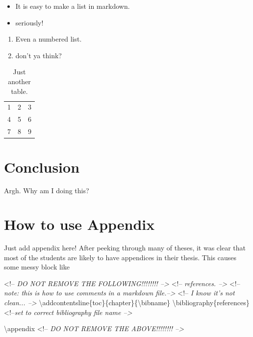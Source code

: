 \documentclass[oneside,phd,]{snuthesis}
\newenvironment{Shaded}{\begin{snugshade}}{\end{snugshade}}
\newcommand{\CommentTok}[1]{\textcolor[rgb]{0.56,0.35,0.01}{\textit{{#1}}}}
\newcommand{\NormalTok}[1]{{#1}}
\providecommand{\tightlist}{%
  \setlength{\itemsep}{0pt}\setlength{\parskip}{0pt}}
\begin{document}
\begin{itemize}
\tightlist
\item
  It is easy to make a list in markdown.
\item
  seriously!
\end{itemize}

\begin{enumerate}
\def\labelenumi{\arabic{enumi}.}
\tightlist
\item
  Even a numbered list.
\item
  don't ya think?
\end{enumerate}

\begin{table}
\caption{Just another table.}
\begin{center}
\begin{tabular}{ l | c | r }
  1 & 2 & 3 \\
  4 & 5 & 6 \\
  7 & 8 & 9 \\
\end{tabular}
\end{center}
\end{table}

\chapter{Conclusion}\label{conclusion}

Argh. Why am I doing this? \citet{Nesterov:DoklAkadNaukSssr:1983}
\citep{Boyd:ConvexOptimization:2004}
\citet{Bertsekas:ConvexOptimizationTheory:2009}




\appendix

\chapter{How to use Appendix}\label{how-to-use-appendix}

Just add appendix here! After peeking through many of theses, it was
clear that most of the students are likely to have appendices in their
thesis. This causes some messy block like

\begin{Shaded}
\begin{Highlighting}[]
\NormalTok{<!--}\CommentTok{ DO NOT REMOVE THE FOLLOWING!!!!!!!! -->}
\NormalTok{<!--}\CommentTok{ references. -->} 
\NormalTok{<!--}\CommentTok{ note: this is how to use comments }
\CommentTok{in a markdown file.-->}
\NormalTok{<!--}\CommentTok{ I know it's not clean...  -->}
\NormalTok{\textbackslash{}addcontentsline\{toc\}\{chapter\}\{\textbackslash{}bibname\}}
\NormalTok{\textbackslash{}bibliography\{references\} <!--}\CommentTok{set to correct bibliography file name -->}

\NormalTok{\textbackslash{}appendix}
\NormalTok{<!--}\CommentTok{ DO NOT REMOVE THE ABOVE!!!!!!!! -->}
\end{Highlighting}
\end{Shaded}
\end{document}
